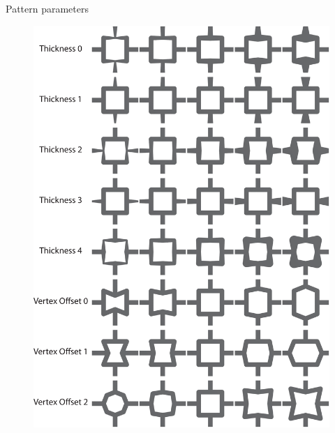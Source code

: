 \begin{frame}{Pattern parameters}
\begin{figure}
\hspace{\fill}
\includegraphics[height=0.8\textheight]{Images/box_2D_param.pdf}
\hspace{\fill}
\end{figure}
\end{frame}


